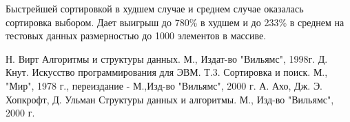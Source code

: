 \documentclass[a4paper,12pt]{report}
\begin{document}
			Быстрейшей сортировкой в худшем случае и среднем случае оказалась сортировка выбором. Дает выигрыш до 780\% в худшем и до 233\% в среднем на тестовых данных размерностью до 1000 элементов в массиве.
      
    \begin{thebibliography}{}
	    Н. Вирт Алгоритмы и структуры данных. М., Издат-во "Вильямс", 1998г.
	    Д. Кнут. Искусство программирования для ЭВМ. Т.3. Сортировка и поиск. М., "Мир", 1978 г., переиздание - М.,Изд-во "Вильямс", 2000 г.
	    А. Ахо, Дж. Э. Хопкрофт, Д. Ульман Структуры данных и алгоритмы. М., Изд-во "Вильямс", 2000 г.
	\end{thebibliography}
       
\end{document}
